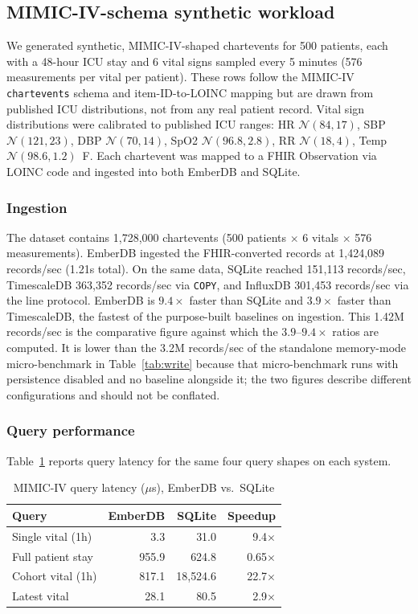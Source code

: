 \documentclass[journal]{IEEEtran}
\begin{document}
\subsection{MIMIC-IV-schema synthetic workload}
\label{sec:eval-synth}

We generated synthetic, MIMIC-IV-shaped chartevents for 500 patients, each with a 48-hour ICU stay and 6 vital signs sampled every 5 minutes (576 measurements per vital per patient). These rows follow the MIMIC-IV \texttt{chartevents} schema and item-ID-to-LOINC mapping but are drawn from published ICU distributions, not from any real patient record.
Vital sign distributions were calibrated to published ICU ranges: HR $\mathcal{N}(84, 17)$, SBP $\mathcal{N}(121, 23)$, DBP $\mathcal{N}(70, 14)$, SpO2 $\mathcal{N}(96.8, 2.8)$, RR $\mathcal{N}(18, 4)$, Temp $\mathcal{N}(98.6, 1.2)$~\textdegree F.
Each chartevent was mapped to a FHIR Observation via LOINC code and ingested into both EmberDB and SQLite.

\subsubsection{Ingestion}
The dataset contains 1{,}728{,}000 chartevents (500 patients $\times$ 6 vitals $\times$ 576 measurements).
EmberDB ingested the FHIR-converted records at 1{,}424{,}089 records/sec (1.21s total). On the same data, SQLite reached 151{,}113 records/sec, TimescaleDB 363{,}352 records/sec via \texttt{COPY}, and InfluxDB 301{,}453 records/sec via the line protocol. EmberDB is $9.4\times$ faster than SQLite and $3.9\times$ faster than TimescaleDB, the fastest of the purpose-built baselines on ingestion.
This 1.42M records/sec is the comparative figure against which the $3.9$--$9.4\times$ ratios are computed. It is lower than the 3.2M records/sec of the standalone memory-mode micro-benchmark in Table~\ref{tab:write} because that micro-benchmark runs with persistence disabled and no baseline alongside it; the two figures describe different configurations and should not be conflated.

\subsubsection{Query performance}
Table~\ref{tab:mimic_query} reports query latency for the same four query shapes on each system.

\begin{table}[htbp]
\centering
\caption{MIMIC-IV query latency ($\mu$s), EmberDB vs.\ SQLite}
\label{tab:mimic_query}
\begin{tabular}{lrrr}
\toprule
\textbf{Query} & \textbf{EmberDB} & \textbf{SQLite} & \textbf{Speedup} \\
\midrule
Single vital (1h) & 3.3 & 31.0 & 9.4$\times$ \\
Full patient stay & 955.9 & 624.8 & 0.65$\times$ \\
Cohort vital (1h) & 817.1 & 18{,}524.6 & 22.7$\times$ \\
Latest vital & 28.1 & 80.5 & 2.9$\times$ \\
\bottomrule
\end{tabular}
\end{table}
\end{document}
